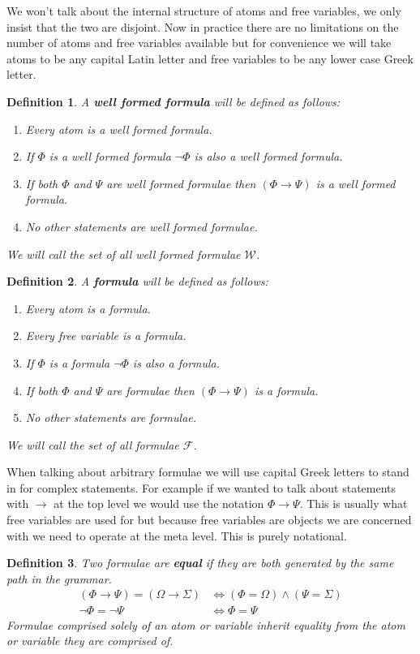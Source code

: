 \documentclass{article}
\newtheorem{defin}{Definition}
\begin{document}
We won't talk about the internal structure of atoms and free variables, we only insist that the two are disjoint.
Now in practice there are no limitations on the number of atoms and free variables available but for convenience we will take atoms to be any capital Latin letter and free variables to be any lower case Greek letter.

\begin{defin}
A \textbf{well formed formula} will be defined as follows:
\begin{enumerate}
\item Every atom is a well formed formula.
\item If $\Phi$ is a well formed formula $\neg\Phi$ is also a well formed formula.
\item If both $\Phi$ and $\Psi$ are well formed formulae then $(\Phi\rightarrow\Psi)$ is a well formed formula.
\item No other statements are well formed formulae.
\end{enumerate}
We will call the set of all well formed formulae $\mathcal{W}$.
\end{defin}


\begin{defin}
A \textbf{formula} will be defined as follows:
\begin{enumerate}
\item Every atom is a formula.
\item Every free variable is a formula.
\item If $\Phi$ is a formula $\neg\Phi$ is also a formula.
\item If both $\Phi$ and $\Psi$ are formulae then $(\Phi\rightarrow\Psi)$ is a formula.
\item No other statements are formulae.
\end{enumerate}
We will call the set of all formulae $\mathcal{F}$.
\end{defin}

When talking about arbitrary formulae we will use capital Greek letters to stand in for complex statements.
For example if we wanted to talk about statements with $\rightarrow$ at the top level we would use the notation $\Phi \rightarrow \Psi$.
This is usually what free variables are used for but because free variables are objects we are concerned with we need to operate at the meta level.
This is purely notational.

\begin{defin}
Two formulae are \textbf{equal} if they are both generated by the same path in the grammar.
\begin{align*}
(\Phi \rightarrow \Psi) = (\Omega \rightarrow \Sigma) &\iff (\Phi = \Omega) \land (\Psi = \Sigma) \\
\neg \Phi = \neg \Psi &\iff \Phi = \Psi
\end{align*}
Formulae comprised solely of an atom or variable inherit equality from the atom or variable they are comprised of.
\end{defin}
\end{document}
